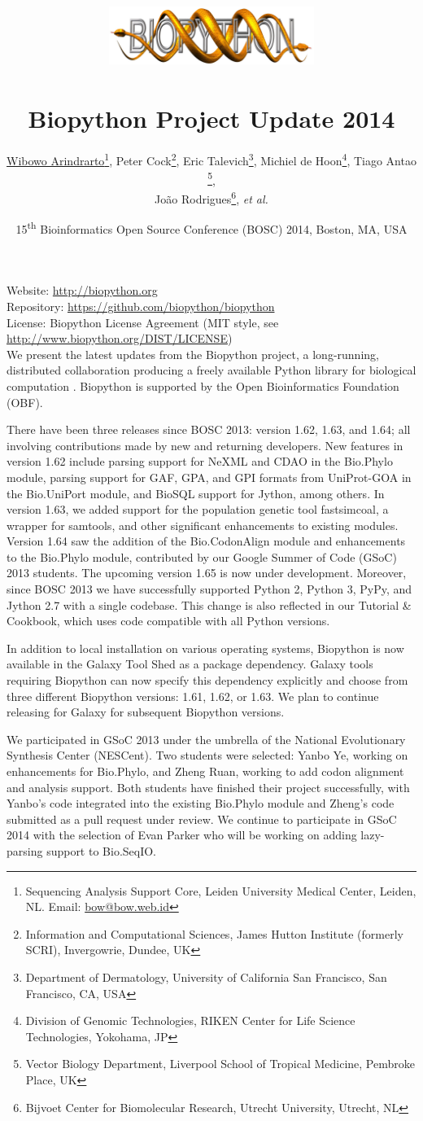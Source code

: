 \documentclass[10pt,oneside]{article}
\title{%
\vspace{-1.5in}
\includegraphics[width=0.5\textwidth]{biopython.jpg}\\
~\\Biopython Project Update 2014}
\author{
    \underline{Wibowo Arindrarto}\footnote{Sequencing Analysis Support Core, Leiden University Medical Center, Leiden, NL. Email: \href{mailto:bow@bow.web.id}{bow@bow.web.id}},
    Peter Cock\footnote{Information and Computational Sciences, James Hutton Institute (formerly SCRI), Invergowrie, Dundee, UK},
    Eric Talevich\footnote{Department of Dermatology, University of California San Francisco, San Francisco, CA, USA},
    Michiel de Hoon\footnote{Division of Genomic Technologies, RIKEN Center for Life Science Technologies, Yokohama, JP},
    Tiago Antao \footnote{Vector Biology Department, Liverpool School of Tropical Medicine, Pembroke Place, UK},
    \\
    Jo\~{a}o Rodrigues\footnote{Bijvoet Center for Biomolecular Research, Utrecht University, Utrecht, NL},
    \textit{et al.}}
\date{15\textsuperscript{th} Bioinformatics Open Source Conference (BOSC) 2014, Boston, MA, USA}
\begin{document}
\maketitle
\thispagestyle{empty}

\vspace{-0.2in}
\noindent
Website: \url{http://biopython.org} \\
Repository: \url{https://github.com/biopython/biopython} \\
License: Biopython License Agreement (MIT style, see \url{http://www.biopython.org/DIST/LICENSE}) \\

We present the latest updates from the Biopython project, a long-running,
distributed collaboration producing a freely available Python library for
biological computation \citep{AppNote}. Biopython is supported by the Open
Bioinformatics Foundation (OBF).

There have been three releases since BOSC 2013: version 1.62, 1.63, and 1.64; all
involving contributions made by new and returning developers. New features
in version 1.62 include parsing support for NeXML and CDAO in the Bio.Phylo
module, parsing support for GAF, GPA, and GPI formats from UniProt-GOA
in the Bio.UniPort module, and BioSQL support for Jython, among others.
In version 1.63, we added  support for the population genetic tool
fastsimcoal, a wrapper for samtools, and other significant enhancements to
existing modules. Version 1.64 saw the addition of the Bio.CodonAlign module
and enhancements to the Bio.Phylo module, contributed by our Google Summer
of Code (GSoC) 2013 students. The upcoming version 1.65 is now under development.
Moreover, since BOSC 2013 we have successfully supported Python 2, Python 3,
PyPy, and Jython 2.7 with a single codebase. This change is also reflected in
our Tutorial \& Cookbook, which uses code compatible with all Python versions.

In addition to local installation on various operating systems, Biopython
is now available in the Galaxy Tool Shed \citep{ToolShed} as a package
dependency. Galaxy tools requiring Biopython can now specify this dependency
explicitly and choose from three different Biopython versions: 1.61, 1.62, or
1.63. We plan to continue releasing for Galaxy for subsequent Biopython versions.

We participated in GSoC 2013 under the umbrella of the National Evolutionary
Synthesis Center (NESCent). Two students were selected: Yanbo Ye, working on
enhancements for Bio.Phylo, and Zheng Ruan, working to add codon alignment and
analysis support. Both students have finished their project successfully, with
Yanbo's code integrated into the existing Bio.Phylo module and Zheng's code
submitted as a pull request under review. We continue to participate in GSoC 2014
with the selection of Evan Parker who will be working on adding lazy-parsing
support to Bio.SeqIO.
\end{document}
